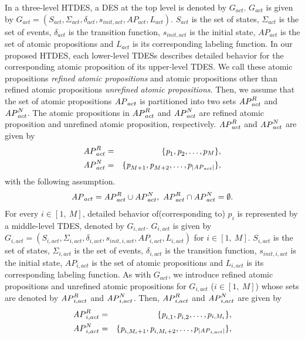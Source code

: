 \documentclass[journal,twoside,web]{IEEEtran}
\newcommand{\AP}{{\textit AP}}
\begin{document}
In a three-level HTDES, a DES at the top level is denoted by $G_{act}$.
$G_{act}$ is given by $G_{act}=(S_{act},\Sigma_{act},\delta_{act},s_{init,act},AP_{act},L_{act})$.
%
$S_{act}$ is the set of states, $\Sigma_{act}$ is the set of events, $\delta_{act}$ is the transition function, $s_{init,act}$ is the initial state, $AP_{act}$ is the set of atomic propositions and $L_{act}$ is its corresponding labeling function.
In our proposed HTDES, each lower-level TDESs describes detailed behavior for the corresponding atomic proposition of its upper-level TDES.
We call these atomic propositions \textit{refined atomic propositions} and atomic propositions other than refined atomic propositions \textit{unrefined atomic propositions}.
Then, we assume that the set of atomic propositions $\AP_{act}$ is partitioned into two sets $\AP_{act}^{R}$ and $\AP_{act}^{N}$.
The atomic propositions in $\AP_{act}^{R}$ and $\AP_{act}^{N}$ are refined atomic proposition and unrefined atomic proposition, respectively.
%
$\AP_{act}^R$ and $\AP_{act}^N$ are given by
\begin{eqnarray}
\AP_{act}^R&=&\{\textit{p}_1,\textit{p}_2,\ldots,p_{M}\}, \notag \\
\AP_{act}^N&=&\{\textit{p}_{M+1},\textit{p}_{M+2},\ldots,p_{|\AP_{act}|}\},\notag 
\end{eqnarray}
%
with the following assumption.
%
\begin{align}
\AP_{act}=\AP_{act}^R \cup \AP_{act}^N,~
\AP_{act}^R \cap \AP_{act}^N=\emptyset.\notag
\end{align}
%
For every $i \in [1,\ M]$, detailed behavior of(corresponding to) $p_i$ is represented by a middle-level TDES, denoted by $G_{i,act}$. 
$G_{i,act}$ is given by $G_{i,act}=(S_{i,act},\Sigma_{i,act},\delta_{i,act},s_{init,i,act},AP_{i,act},L_{i,act})$ for $i \in [1,\ M]$.
$S_{i,act}$ is the set of states, $\Sigma_{i,act}$ is the set of events, $\delta_{i,act}$ is the transition function, $s_{init,i,act}$ is the initial state, $AP_{i,act}$ is the set of atomic propositions and $L_{i,act}$ is its corresponding labeling function.
%
As with $G_{act}$, we introduce refined atomic propositions and unrefined atomic propositions for $G_{i,act}$ ($i \in [1,\ M]$) whose sets are denoted by $\AP_{i,act}^R$ and $\AP_{i,act}^N$.
Then, $\AP_{i,act}^R$ and $\AP_{i,act}^N$ are given by
\begin{eqnarray}
\AP_{i,act}^R&=&\{\textit{p}_{i,1},\textit{p}_{i,2},\ldots,p_{i,M_i}\},\notag\\
\AP_{i,act}^N&=&\{\textit{p}_{i,M_i+1},\textit{p}_{i,M_i+2},\ldots,p_{|\AP_{i,act}|}\},\notag
\end{eqnarray}
\end{document}
